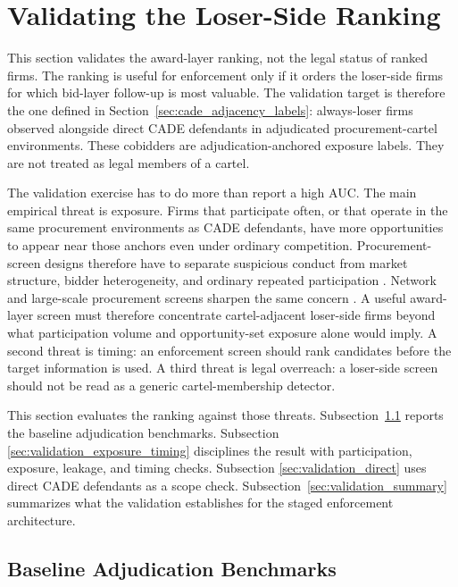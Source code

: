 \section{Validating the Loser-Side Ranking}
\label{sec:validation}

This section validates the award-layer ranking, not the legal
status of ranked firms. The ranking is useful for enforcement
only if it orders the loser-side firms for which bid-layer
follow-up is most valuable. The validation target is therefore
the one defined in Section~\ref{sec:cade_adjacency_labels}:
always-loser firms observed alongside direct CADE defendants in
adjudicated procurement-cartel environments. These cobidders are
adjudication-anchored exposure labels. They are not treated as
legal members of a cartel.

The validation exercise has to do more than report a high AUC.
The main empirical threat is exposure. Firms that participate
often, or that operate in the same procurement environments as
CADE defendants, have more opportunities to appear near those
anchors even under ordinary competition. Procurement-screen
designs therefore have to separate suspicious conduct from market
structure, bidder heterogeneity, and ordinary repeated
participation \citep{porter1993detection,bajari2003deciding}.
Network and large-scale procurement screens sharpen the same
concern \citep{conley2016detecting,kawai2022detecting}. A useful award-layer
screen must therefore concentrate cartel-adjacent loser-side
firms beyond what participation volume and opportunity-set exposure alone
would imply. A second threat is timing: an enforcement screen
should rank candidates before the target information is used.
A third threat is legal overreach: a loser-side screen should
not be read as a generic cartel-membership detector.

This section evaluates the ranking against those threats.
Subsection~\ref{sec:validation_baseline} reports the baseline
adjudication benchmarks. Subsection
\ref{sec:validation_exposure_timing} disciplines the result with
participation, exposure, leakage, and timing checks. Subsection
\ref{sec:validation_direct} uses direct CADE defendants as a
scope check. Subsection~\ref{sec:validation_summary} summarizes
what the validation establishes for the staged enforcement
architecture.

\subsection{Baseline Adjudication Benchmarks}
\label{sec:validation_baseline}

